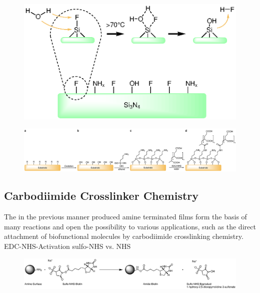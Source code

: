 \begin{figure}
	\centering
	\includegraphics[width=1\linewidth]{Ressources/Chemistry/SiN}
	\label{fig:chem:func:sin}
\end{figure}



\begin{figure}[htb!]
	\centering
	\includegraphics[width=1\linewidth]{Ressources/Chemistry/Substrate}
	\label{fig:chem:func:substrate}
\end{figure}



\subsection{Carbodiimide Crosslinker Chemistry}
The in the previous manner produced \gls{amine} terminated films form the basis of many reactions and open the possibility to various applications, such as the direct attachment of biofunctional molecules by carbodiimide crosslinking chemistry.\cite{lit:bio:BioconjugateTechniques}
EDC-NHS-Activation
sulfo-NHS vs. NHS
\begin{figure}[htb!]
\centering
\includegraphics[width=\textwidth]{./Ressources/Chemistry/Sulfo-NHS.eps}
\label{fig:Chem:NH2-NHS}
\end{figure}

